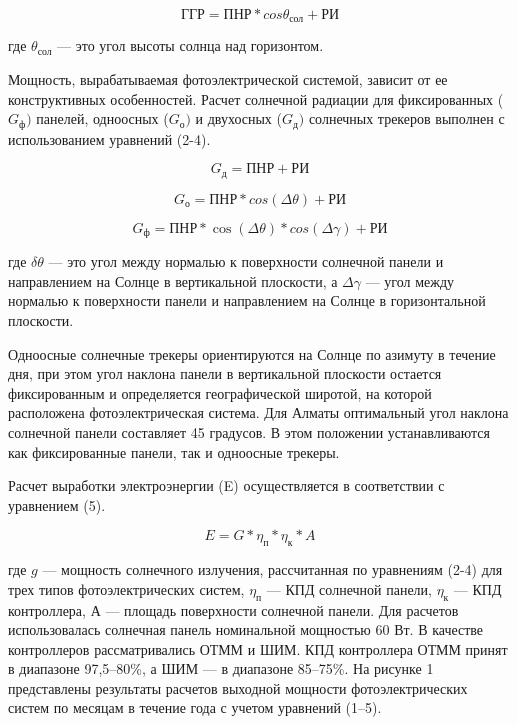 \begin{multicols}{2}
\begin{equation}
\text{ГГР} = \text{ПНР}*cos\theta_{\text{сол}} + \text{РИ}
\end{equation}

где \(\theta_{\text{сол}}\) --- это угол высоты солнца над горизонтом.

Мощность, вырабатываемая фотоэлектрической системой, зависит от ее
конструктивных особенностей. Расчет солнечной радиации для фиксированных
(\(G_{\text{ф}})\) панелей, одноосных (\(G_{\text{о}})\) и двухосных (\(G_{\text{д}})\)
солнечных трекеров выполнен с использованием уравнений (2-4).

\begin{equation}
G_{\text{д}} = \text{ПНР} + \text{РИ}
\end{equation}

\begin{equation}
G_{\text{о}} = \text{ПНР}*cos(\Delta\theta) + \text{РИ}
\end{equation}

\begin{equation}
G_{\text{ф}} = \text{ПНР}*\cos(\Delta\theta)*cos(\Delta\gamma) + \text{РИ}
\end{equation}

где \(\delta\theta\) --- это угол между нормалью к поверхности
солнечной панели и направлением на Солнце в вертикальной плоскости, а
\(\Delta\gamma\) --- угол между нормалью к поверхности панели и
направлением на Солнце в горизонтальной плоскости.

Одноосные солнечные трекеры ориентируются на Солнце по азимуту в течение
дня, при этом угол наклона панели в вертикальной плоскости остается
фиксированным и определяется географической широтой, на которой
расположена фотоэлектрическая система. Для Алматы оптимальный угол
наклона солнечной панели составляет 45 градусов. В этом положении
устанавливаются как фиксированные панели, так и одноосные трекеры.

Расчет выработки электроэнергии (E) осуществляется в соответствии с
уравнением (5).

\begin{equation}
E = G*\eta_{\text{п}}*\eta_{\text{к}}*A
\end{equation}

где \(g\) --- мощность солнечного излучения, рассчитанная по
уравнениям (2-4) для трех типов фотоэлектрических систем, \(\eta_{п}\)
--- КПД солнечной панели, \(\eta_{к}\) --- КПД контроллера, А ---
площадь поверхности солнечной панели. Для расчетов использовалась
солнечная панель номинальной мощностью 60 Вт. В качестве контроллеров
рассматривались ОТММ и ШИМ. КПД контроллера ОТММ принят в диапазоне
97,5--80\%, а ШИМ --- в диапазоне 85--75\%. На рисунке 1 представлены
результаты расчетов выходной мощности фотоэлектрических систем по
месяцам в течение года с учетом уравнений (1--5).
\end{multicols}

